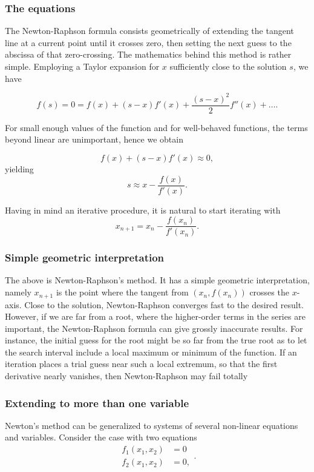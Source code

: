 \documentclass{beamer}
\begin{document}
\begin{frame}
\frametitle{The equations}

The Newton-Raphson formula consists geometrically of extending the
tangent line at a current point until it crosses zero, then setting
the next guess to the abscissa of that zero-crossing.  The mathematics
behind this method is rather simple. Employing a Taylor expansion for
$x$ sufficiently close to the solution $s$, we have

\[
    f(s)=0=f(x)+(s-x)f'(x)+\frac{(s-x)^2}{2}f''(x) +\dots.
    \label{eq:taylornr}
\]

For small enough values of the function and for well-behaved
functions, the terms beyond linear are unimportant, hence we obtain

\[
   f(x)+(s-x)f'(x)\approx 0,
\]
yielding
\[
   s\approx x-\frac{f(x)}{f'(x)}.
\]

Having in mind an iterative procedure, it is natural to start iterating with
\[
   x_{n+1}=x_n-\frac{f(x_n)}{f'(x_n)}.
\]
\end{frame}

\begin{frame}
\frametitle{Simple geometric interpretation}

The above is Newton-Raphson's method. It has a simple geometric
interpretation, namely $x_{n+1}$ is the point where the tangent from
$(x_n,f(x_n))$ crosses the $x$-axis.  Close to the solution,
Newton-Raphson converges fast to the desired result. However, if we
are far from a root, where the higher-order terms in the series are
important, the Newton-Raphson formula can give grossly inaccurate
results. For instance, the initial guess for the root might be so far
from the true root as to let the search interval include a local
maximum or minimum of the function.  If an iteration places a trial
guess near such a local extremum, so that the first derivative nearly
vanishes, then Newton-Raphson may fail totally
\end{frame}

\begin{frame}
\frametitle{Extending to more than one variable}

Newton's method can be generalized to systems of several non-linear equations
and variables. Consider the case with two equations
\[
   \begin{array}{cc} f_1(x_1,x_2) &=0\\
                     f_2(x_1,x_2) &=0,\end{array}.
\]
\end{frame}
\end{document}
